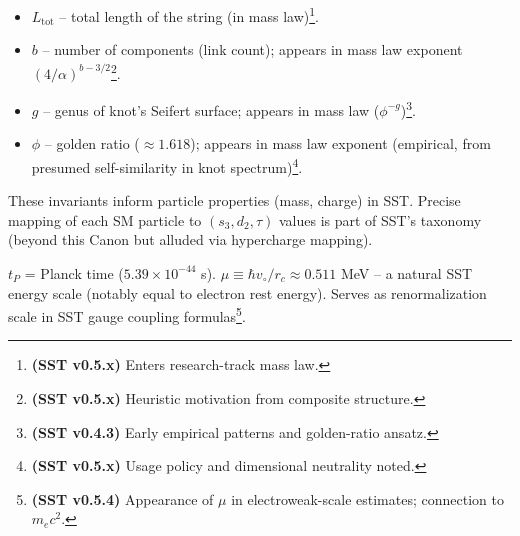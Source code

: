 \documentclass[reprint,aps,onecolumn,nofootinbib]{revtex4-2}
\begin{document}
\begin{description}[leftmargin=1.3cm,labelsep=0.4cm, itemsep=1ex]
\begin{itemize}
    \item $L_{\text{tot}}$ – total length of the string (in mass law)\footnote{\textbf{(SST v0.5.x)} Enters research-track mass law.}.
    \item $b$ – number of components (link count); appears in mass law exponent $(4/\alpha)^{b-3/2}$\footnote{\textbf{(SST v0.5.x)} Heuristic motivation from composite structure.}.
    \item $g$ – genus of knot’s Seifert surface; appears in mass law ($\phi^{-g}$)\footnote{\textbf{(SST v0.4.3)} Early empirical patterns and golden-ratio ansatz.}.
    \item $\phi$ – golden ratio ($\approx1.618$); appears in mass law exponent (empirical, from presumed self-similarity in knot spectrum)\footnote{\textbf{(SST v0.5.x)} Usage policy and dimensional neutrality noted.}.
    \end{itemize}
    These invariants inform particle properties (mass, charge) in SST. Precise mapping of each SM particle to $(s_3, d_2, \tau)$ values is part of SST’s taxonomy (beyond this Canon but alluded via hypercharge mapping).
    \item[\textbf{Planck/core scales $(t_P, \mu)$:}] $t_P$ = Planck time ($5.39\times10^{-44}$ s). $\mu \equiv \hbar v_{\circ}/r_c \approx0.511$ MeV – a natural SST energy scale (notably equal to electron rest energy). Serves as renormalization scale in SST gauge coupling formulas\footnote{\textbf{(SST v0.5.4)} Appearance of $\mu$ in electroweak-scale estimates; connection to $m_e c^2$.}.
    \end{description}

    \nocite{*}
    
    
\end{document}

